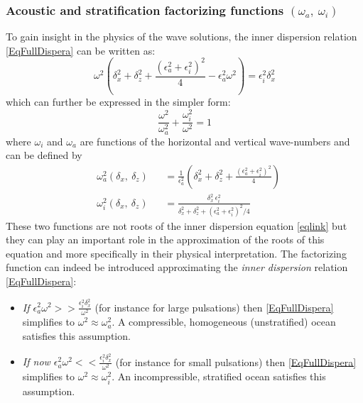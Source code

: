 \documentclass[a4paper,11pt]{article}
\begin{document}
\subsubsection{Acoustic and stratification factorizing functions $(\omega_a,\ \omega_i)$}
\label{subsubsectionFacto}
To gain insight in the physics of the wave solutions, the inner dispersion relation \ref{EqFullDispera} can be written as:
\begin{equation}
\omega^2
	\left(
	\delta_x^2+\delta_z^2
	+\frac{(\epsilon_a^2+\epsilon_i^2)^2}{4}
	-\epsilon_a^2\omega^2
	\right)
	=\epsilon_i^2 \delta_x^2
	\label{eqomegaparam2}
\end{equation}
which can further be expressed in the simpler form:
\begin{equation}
	\frac{\omega^2}{\omega_a^2}+\frac{\omega_i^2}{\omega^2}=1
	\label{eqlink}
\end{equation}
where $\omega_i$ and $\omega_a$ are functions of the horizontal and vertical wave-numbers and can be defined by
\begin{subequations}
	\label{EqDispSols}
	\begin{alignat}{2}	
	\label{SolAcous}
	& \omega_a^2(\delta_x,\ \delta_z) &&=\frac{1}{\epsilon_a^2}\left(
	\delta_x^2+\delta_z^2
	+\frac{(\epsilon_a^2+\epsilon_i^2)^2}{4}
	\right)\\
	\label{SolGrav}
	&\omega_i^2(\delta_x,\ \delta_z)  &&=
	\frac{\delta_x^2\ \epsilon_i^2}{\delta_x^2+\delta_z^2
	+(\epsilon_a^2+\epsilon_i^2)^2/4}
	\end{alignat}
\end{subequations}
These two functions are not roots of the inner dispersion equation \ref{eqlink} but they can play an important role in the approximation of the roots of this equation and more specifically in their physical interpretation. The factorizing function can indeed be introduced approximating the \textit{inner dispersion} relation \ref{EqFullDispera}:
\begin{itemize}
	\item \textit{If
	$\epsilon_a^2\omega^2 >> \frac{\epsilon_i^2\delta_x^2}{\omega^2}$} (for instance for large pulsations) then \ref{EqFullDispera} simplifies to 
	$\omega^2\approx\omega_a^2$. A compressible, homogeneous (unstratified) ocean satisfies this assumption.
	\item \textit{If now $\epsilon_a^2\omega^2<< \frac{\epsilon_i^2\delta_x^2}{\omega^2}$} (for instance for small pulsations) then \ref{EqFullDispera} simplifies to $\omega^2\approx\omega_i^2$. An incompressible, stratified ocean satisfies this assumption.
\end{itemize}
\end{document}
